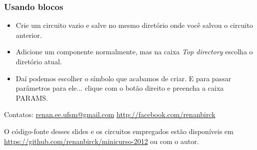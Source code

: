 \documentclass{beamer}
\begin{document}
\begin{frame}
\frametitle{Usando blocos}
\begin{itemize}
\item Crie um circuito vazio e salve no mesmo diretório onde você salvou o circuito anterior.
\item Adicione um componente normalmente, mas na caixa \textit{Top directory} escolha o diretório atual.
\item Daí podemos escolher o símbolo que acabamos de criar. E para passar parâmetros para ele... clique com o botão direito e preencha a caixa PARAMS.
\end{itemize}
\end{frame}



\begin{frame}
Contatos: \url{renan.ee.ufsm@gmail.com} \url{http://facebook.com/renanbirck} \newline

O código-fonte desses slides e os circuitos empregados estão disponíveis em \url{https://github.com/renanbirck/minicurso-2012} ou com o autor.
\end{frame}
\end{document}
